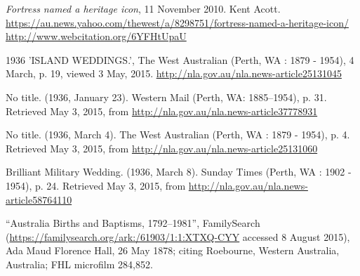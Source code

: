 \begin{thebibliography}{999}
	\emph{Fortress named a heritage icon}, 11 November 2010. Kent Acott.
	\url{https://au.news.yahoo.com/thewest/a/8298751/fortress-named-a-heritage-icon/}
	\url{http://www.webcitation.org/6YFHtUpaU}

    1936 'ISLAND WEDDINGS.', The West Australian (Perth, WA : 1879 - 1954), 4 March, p. 19, viewed 3 May, 2015.
    \url{http://nla.gov.au/nla.news-article25131045}

	No title. (1936, January 23). Western Mail (Perth, WA: 1885--1954), p. 31. Retrieved May 3, 2015,
	from \url{http://nla.gov.au/nla.news-article37778931}

	No title. (1936, March 4). The West Australian (Perth, WA : 1879 - 1954), p. 4.
	Retrieved May 3, 2015, from \url{http://nla.gov.au/nla.news-article25131060}

	Brilliant Military Wedding. (1936, March 8). Sunday Times (Perth, WA : 1902 - 1954), p. 24.
	Retrieved May 3, 2015, from \url{http://nla.gov.au/nla.news-article58764110}

	``Australia Births and Baptisms, 1792--1981'', FamilySearch
	(\url{https://familysearch.org/ark:/61903/1:1:XTXQ-CYY} accessed 8 August 2015),
	Ada Maud Florence Hall, 26 May 1878; citing Roebourne, Western Australia, Australia;
	FHL microfilm 284,852.

\end{thebibliography}
